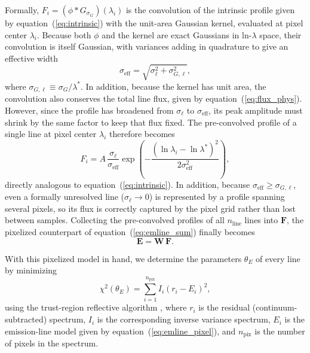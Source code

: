 \documentclass[modern,linenumbers]{aastex701}
\begin{document}
Formally, $F_i = (\phi * G_{\sigma_G})(\lambda_i)$ is the convolution
of the intrinsic profile given by equation~(\ref{eq:intrinsic}) with
the unit-area Gaussian kernel, evaluated at pixel center
$\lambda_i$. Because both $\phi$ and the kernel are exact Gaussians in
ln-$\lambda$ space, their convolution is itself Gaussian, with
variances adding in quadrature to give an effective width
\begin{equation}
  \sigma_\mathrm{eff} = \sqrt{\sigma_\ell^2 + \sigma_{G,\ell}^2},
  \label{eq:sigmaeff}
\end{equation}
\noindent where $\sigma_{G,\ell} \equiv \sigma_G/\lambda^*$. In
addition, because the kernel has unit area, the convolution also
conserves the total line flux, given by
equation~(\ref{eq:flux_phys}). However, since the profile has
broadened from $\sigma_\ell$ to $\sigma_\mathrm{eff}$, its peak
amplitude must shrink by the same factor to keep that flux fixed.  The
pre-convolved profile of a single line at pixel center $\lambda_i$
therefore becomes
\begin{equation}
  F_i = A\,\frac{\sigma_\ell}{\sigma_\mathrm{eff}}
    \exp\!\left(-\frac{(\ln\lambda_i-\ln\lambda^*)^2}{2\sigma_\mathrm{eff}^2}\right),
  \label{eq:model}
\end{equation}
directly analogous to equation~(\ref{eq:intrinsic}). In addition,
because $\sigma_\mathrm{eff} \geq \sigma_{G,\ell}$, even a formally
unresolved line ($\sigma_\ell \to 0$) is represented by a profile
spanning several pixels, so its flux is correctly captured by the
pixel grid rather than lost between samples. Collecting the
pre-convolved profiles of all $n_\mathrm{line}$ lines into
$\mathbf{F}$, the pixelized counterpart of
equation~(\ref{eq:emline_sum}) finally becomes
\begin{equation}
  \mathbf{E} = \mathbf{W}\,\mathbf{F}.
  \label{eq:emline_pixel}
\end{equation}

With this pixelized model in hand, we determine the parameters
$\theta_E$ of every line by minimizing
\begin{equation}
  \chi^2(\theta_E) = \sum_{i=1}^{n_\mathrm{pix}} I_i\left(r_i - E_i\right)^2,
  \label{eq:chi2line}
\end{equation}
using the trust-region reflective algorithm
\citep[\texttt{scipy.optimize.least\_squares};][]{branch99a}, where
$r_i$ is the residual (continuum-subtracted) spectrum, $I_i$ is the
corresponding inverse variance spectrum, $E_i$ is the emission-line
model given by equation~(\ref{eq:emline_pixel}), and $n_\mathrm{pix}$
is the number of pixels in the spectrum.
\end{document}
